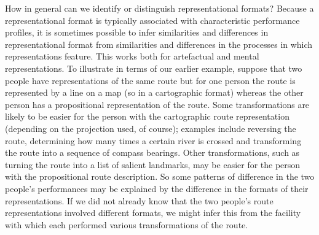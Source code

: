 \documentclass[12pt,\papersize]{extarticle}
\begin{document}
How in general can we identify or distinguish representational formats? Because a representational format is typically associated with characteristic performance profiles, it is sometimes possible to infer similarities and differences in representational format from similarities and differences in the processes in which representations feature. This works both for artefactual and mental representations.  To illustrate in terms of our earlier example, suppose that two people have representations of the same route but for one person the route is represented by a line on a map (so in a cartographic format) whereas the other person has a propositional representation of the route. Some transformations are likely to be easier for the person with the cartographic route representation (depending on the projection used, of course); examples include reversing the route, determining how many times a certain river is crossed and transforming the route into a sequence of compass bearings. Other transformations, such as turning the route into a list of salient landmarks, may be easier for the person with the propositional route description. So some patterns of difference in the two people's performances may be explained by the difference in the formats of their representations. If we did not already know that the two people's route representations involved different formats, we might infer this from the facility with which each performed various transformations of the route.
\end{document}
